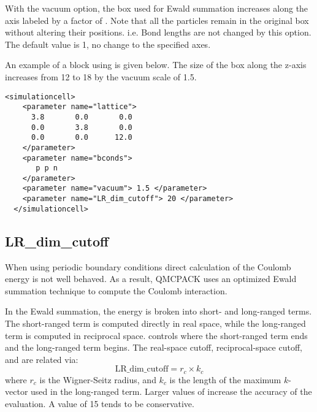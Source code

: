 With the vacuum option, the box used for Ewald summation increases along the axis labeled  by a factor of .
Note that all the particles remain in the original box without altering their positions. i.e. Bond lengths are not changed by this option.
The default value is 1, no change to the specified axes.

An example of a  block using  is given below.
The size of the box along the z-axis increases from 12 to 18 by the vacuum scale of 1.5.
\begin{lstlisting}[style=QMCPXML]
  <simulationcell>
    <parameter name="lattice">
      3.8       0.0       0.0
      0.0       3.8       0.0
      0.0       0.0      12.0
    </parameter>
    <parameter name="bconds">
       p p n
    </parameter>
    <parameter name="vacuum"> 1.5 </parameter>
    <parameter name="LR_dim_cutoff"> 20 </parameter>
  </simulationcell>
\end{lstlisting}

\subsection{LR\_dim\_cutoff}
When using periodic boundary conditions direct calculation of the Coulomb energy is
not well behaved. As a result, QMCPACK uses an optimized Ewald summation technique
to compute the Coulomb interaction.\cite{Natoli1995}

In the Ewald summation, the energy is broken into short- and long-ranged terms.
The short-ranged term is computed directly in real space, while the long-ranged term is computed in reciprocal space.
 controls where the short-ranged term ends and the long-ranged term begins.
The real-space cutoff, reciprocal-space cutoff, and  are related via:
\begin{equation}
\mathrm{LR\_dim\_cutoff} = r_{c} \times k_{c}
\end{equation}
where $r_{c}$ is the Wigner-Seitz radius, and $k_{c}$ is the length of the maximum $k$-vector used in the long-ranged term. Larger
values of  increase the accuracy of the evaluation. A value of 15 tends to be conservative.
